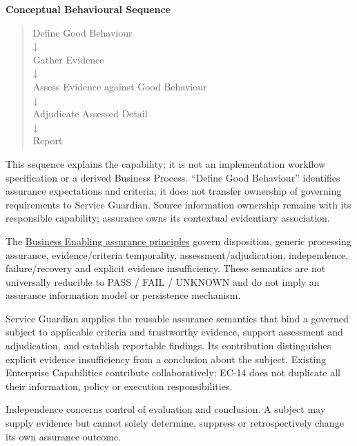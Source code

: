 \par\medskip\textbf{Conceptual Behavioural Sequence}\par


\begin{quote}\small\ttfamily
Define Good Behaviour\\
    ↓\\
Gather Evidence\\
    ↓\\
Assess Evidence against Good Behaviour\\
    ↓\\
Adjudicate Assessed Detail\\
    ↓\\
Report\\

\end{quote}


This sequence explains the capability; it is not an implementation workflow specification or a derived Business Process. “Define Good Behaviour” identifies assurance expectations and criteria; it does not transfer ownership of governing requirements to Service Guardian. Source information ownership remains with its responsible capability; assurance owns its contextual evidentiary association.



The \href{\detokenize{../../../../../docs/markdown/02-strategy/capabilities/business-enabling-capabilities.md#health-service-assurance-approved-business-enabling-capabilities}}{Business Enabling assurance principles} govern disposition, generic processing assurance, evidence/criteria temporality, assessment/adjudication, independence, failure/recovery and explicit evidence insufficiency. These semantics are not universally reducible to PASS / FAIL / UNKNOWN and do not imply an assurance information model or persistence mechanism.



Service Guardian supplies the reusable assurance semantics that bind a governed subject to applicable criteria and trustworthy evidence, support assessment and adjudication, and establish reportable findings. Its contribution distinguishes explicit evidence insufficiency from a conclusion about the subject. Existing Enterprise Capabilities contribute collaboratively; EC-14 does not duplicate all their information, policy or execution responsibilities.



Independence concerns control of evaluation and conclusion. A subject may supply evidence but cannot solely determine, suppress or retrospectively change its own assurance outcome.



